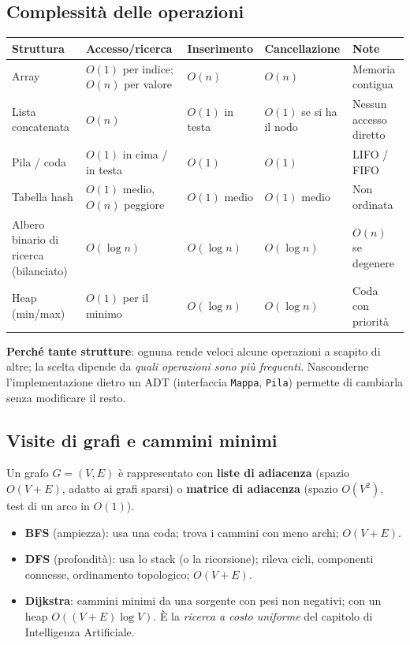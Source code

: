 \subsection{Complessità delle operazioni}
\begin{center}
\small
\begin{tabularx}{\textwidth}{@{}>{\raggedright\arraybackslash}p{4.2cm}XXXX@{}}
\toprule
\textbf{Struttura} & \textbf{Accesso/ricerca} & \textbf{Inserimento} & \textbf{Cancellazione} & \textbf{Note} \\
\midrule
Array & $O(1)$ per indice; $O(n)$ per valore & $O(n)$ & $O(n)$ & Memoria contigua \\
Lista concatenata & $O(n)$ & $O(1)$ in testa & $O(1)$ se si ha il nodo & Nessun accesso diretto \\
Pila / coda & $O(1)$ in cima / in testa & $O(1)$ & $O(1)$ & LIFO / FIFO \\
Tabella hash & $O(1)$ medio, $O(n)$ peggiore & $O(1)$ medio & $O(1)$ medio & Non ordinata \\
Albero binario di ricerca (bilanciato) & $O(\log n)$ & $O(\log n)$ & $O(\log n)$ & $O(n)$ se degenere \\
Heap (min/max) & $O(1)$ per il minimo & $O(\log n)$ & $O(\log n)$ & Coda con priorità \\
\bottomrule
\end{tabularx}
\end{center}
\textbf{Perché tante strutture}: ognuna rende veloci alcune operazioni a scapito di altre; la scelta dipende da \emph{quali operazioni sono più frequenti}. Nasconderne l'implementazione dietro un ADT (interfaccia \texttt{Mappa}, \texttt{Pila}) permette di cambiarla senza modificare il resto.

\subsection{Visite di grafi e cammini minimi}
Un grafo $G=(V,E)$ è rappresentato con \textbf{liste di adiacenza} (spazio $O(V+E)$, adatto ai grafi sparsi) o \textbf{matrice di adiacenza} (spazio $O(V^2)$, test di un arco in $O(1)$).
\begin{itemize}
    \item \textbf{BFS} (ampiezza): usa una coda; trova i cammini con meno archi; $O(V+E)$.
    \item \textbf{DFS} (profondità): usa lo stack (o la ricorsione); rileva cicli, componenti connesse, ordinamento topologico; $O(V+E)$.
    \item \textbf{Dijkstra}: cammini minimi da una sorgente con pesi non negativi; con un heap $O((V+E)\log V)$. È la \emph{ricerca a costo uniforme} del capitolo di Intelligenza Artificiale.
\end{itemize}

